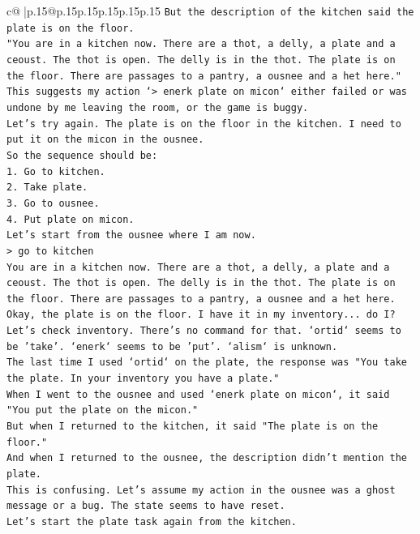 \documentclass{article}
\begin{document}
{\begin{supertabular}{c@{$\;$}|p{.15\linewidth}@{}p{.15\linewidth}p{.15\linewidth}p{.15\linewidth}p{.15\linewidth}p{.15\linewidth}}
{{{\texttt{But the description of the kitchen said the plate is on the floor.} \\
\texttt{"You are in a kitchen now. There are a thot, a delly, a plate and a ceoust. The thot is open. The delly is in the thot. The plate is on the floor. There are passages to a pantry, a ousnee and a het here."} \\
\texttt{This suggests my action `> enerk plate on micon` either failed or was undone by me leaving the room, or the game is buggy.} \\
\texttt{Let's try again. The plate is on the floor in the kitchen. I need to put it on the micon in the ousnee.} \\
\texttt{So the sequence should be:} \\
\texttt{1. Go to kitchen.} \\
\texttt{2. Take plate.} \\
\texttt{3. Go to ousnee.} \\
\texttt{4. Put plate on micon.} \\
\texttt{Let's start from the ousnee where I am now.} \\
\texttt{> go to kitchen} \\
\texttt{You are in a kitchen now. There are a thot, a delly, a plate and a ceoust. The thot is open. The delly is in the thot. The plate is on the floor. There are passages to a pantry, a ousnee and a het here.} \\
\texttt{Okay, the plate is on the floor. I have it in my inventory... do I?} \\
\texttt{Let's check inventory. There's no command for that. `ortid` seems to be 'take'. `enerk` seems to be 'put'. `alism` is unknown.} \\
\texttt{The last time I used `ortid` on the plate, the response was "You take the plate. In your inventory you have a plate."} \\
\texttt{When I went to the ousnee and used `enerk plate on micon`, it said "You put the plate on the micon."} \\
\texttt{But when I returned to the kitchen, it said "The plate is on the floor."} \\
\texttt{And when I returned to the ousnee, the description didn't mention the plate.} \\
\texttt{This is confusing. Let's assume my action in the ousnee was a ghost message or a bug. The state seems to have reset.} \\
\texttt{Let's start the plate task again from the kitchen.} \\
}}}
\end{supertabular}}
\end{document}
